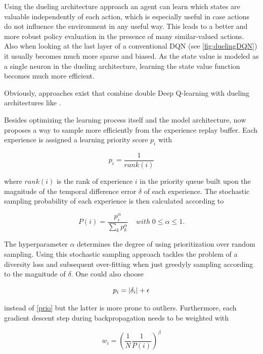 Using the dueling architecture approach an agent can learn which states are valuable independently of each action, which is especially useful in case actions do not influence the environment in any useful way. This leads to a better and more robust policy evaluation in the presence of many similar-valued actions. Also when looking at the last layer of a conventional DQN (see \autoref{fig:duelingDQN}) it usually becomes much more sparse and biased. As the state value is modeled as a single neuron in the dueling architecture, learning the state value function becomes much more efficient. 

Obviously, approaches exist that combine double Deep Q-learning with dueling architectures like \cite{Huang2018}. 

Besides optimizing the learning process itself and the model architecture, \cite{Schaul2016} now proposes a way to sample more efficiently from the experience replay buffer. Each experience is assigned a learning priority score $p_i$ with 

\begin{equation} \label{prio}
	p_i = \frac{1}{rank(i)}
\end{equation}

where $rank(i)$ is the rank of experience $i$ in the priority queue built upon the magnitude of the temporal difference error $\delta$ of each experience. The stochastic sampling probability of each experience is then calculated according to 

\begin{equation} \label{prob}
	P(i) = \frac{p_i^{\alpha}}{\sum_k p_k^{\alpha}} \;\;\;\; with \; 0\le\alpha\le1.
\end{equation}

The hyperparameter $\alpha$ determines the degree of using prioritization over random sampling. Using this stochastic sampling approach tackles the problem of a diversity loss and subsequent over-fitting when just greedyly sampling according to the magnitude of $\delta$. One could also choose 

\begin{equation} \label{prio2}
	p_i = \lvert\delta_i\rvert + \epsilon
\end{equation}

instead of \ref{prio} but the latter is more prone to outliers. Furthermore, each gradient descent step during backpropagation needs to be weighted with 

\begin{equation} \label{weight}
	w_i = ( \frac{1}{N} \frac{1}{P(i)} )^\beta
\end{equation}

